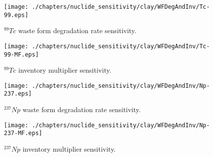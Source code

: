 \begin{figure}[ht!]
\centering
\texttt{[image: ./chapters/nuclide\_sensitivity/clay/WFDegAndInv/Tc-99.eps]}
\caption{$^{99}Tc$ waste form degradation rate sensitivity.}
\label{fig:WFDegTc99}
\end{figure}

\begin{figure}[ht!]
\centering
\texttt{[image: ./chapters/nuclide\_sensitivity/clay/WFDegAndInv/Tc-99-MF.eps]}
\caption{$^{99}Tc$ inventory multiplier sensitivity.}
\label{fig:WFDegTc99MF}
\end{figure}


\begin{figure}[ht!]
\centering
\texttt{[image: ./chapters/nuclide\_sensitivity/clay/WFDegAndInv/Np-237.eps]}
\caption{$^{237}Np$ waste form degradation rate sensitivity.}
\label{fig:WFDegNp237}
\end{figure}

\begin{figure}[ht!]
\centering
\texttt{[image: ./chapters/nuclide\_sensitivity/clay/WFDegAndInv/Np-237-MF.eps]}
\caption{$^{237}Np$ inventory multiplier sensitivity.}
\label{fig:WFDegNp237MF}
\end{figure}

\clearpage 
